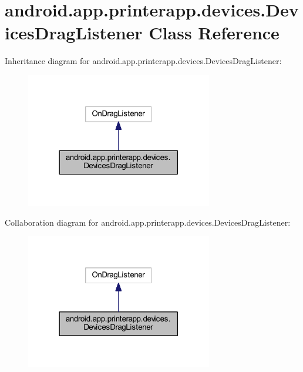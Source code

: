 \hypertarget{classandroid_1_1app_1_1printerapp_1_1devices_1_1_devices_drag_listener}{}\section{android.\+app.\+printerapp.\+devices.\+Devices\+Drag\+Listener Class Reference}
\label{classandroid_1_1app_1_1printerapp_1_1devices_1_1_devices_drag_listener}


Inheritance diagram for android.\+app.\+printerapp.\+devices.\+Devices\+Drag\+Listener\+:
\nopagebreak
\begin{figure}[H]
\begin{center}
\leavevmode
\includegraphics[width=231pt]{classandroid_1_1app_1_1printerapp_1_1devices_1_1_devices_drag_listener__inherit__graph}
\end{center}
\end{figure}


Collaboration diagram for android.\+app.\+printerapp.\+devices.\+Devices\+Drag\+Listener\+:
\nopagebreak
\begin{figure}[H]
\begin{center}
\leavevmode
\includegraphics[width=231pt]{classandroid_1_1app_1_1printerapp_1_1devices_1_1_devices_drag_listener__coll__graph}
\end{center}
\end{figure}
